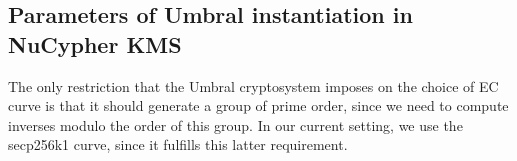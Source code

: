 \documentclass[12pt]{article}
\begin{document}
\subsection{Parameters of Umbral instantiation in NuCypher KMS}
The only restriction that the Umbral cryptosystem imposes on the choice of EC curve is that it should generate a group of prime order, since we need to compute inverses modulo the order of this group. In our current setting, we use the secp256k1 curve, since it fulfills this latter requirement. 


\end{document}
